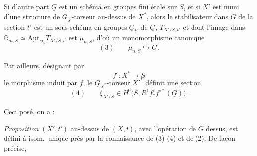 \documentclass[11pt,a4paper]{article}
\begin{document}
Si d'autre part $\underline{G}$ est un schéma en groupes fini étale sur $S$,
et si $X'$ est muni d'une structure de $\underline{G}_X$-torseur au-dessus
de $X^*$, alors le stabilisateur dans 
$\underline{G}$ de la section $t'$ est un sous-schéma en groupes
$\underline{G}_{t'}$ de $\underline{G}$,  
 \struck{\ill{}}
$T_{X'/S, t'}$ et dont l'image dans
 $\mathbb{G}_{m,S} \simeq
\underline{\mathrm{Aut}}_{\mathcal{O}_S} T_{X'/S, t'}$ est $\mu_{n,S}$,
d'où un monomorphisme canonique
\[
  (3) \qquad \mu_{n,S} \hookrightarrow \underline{G} .
\]

Par ailleurs, désignant par
\[
  f^\circ : X^* \longrightarrow S
\]
le morphisme induit par $f$, le $\underline{G}_{X^*}$-torseur $X'^*$ définit
une section
\[
  (4) \qquad \xi_{X'/S} \in H^0\bigl(S, R^1 f^\circ_* f^{\circ *}(\underline{G})\bigr) .
\]

Ceci posé, on a :

\emph{Proposition} $(X', t')$ au-dessus de $(X, t)$, avec l'opération
de $\underline{G}$ dessus, est défini à isom.\ unique près par la
connaissance de (3) (4) et de (2).  De façon précise,
\end{document}
